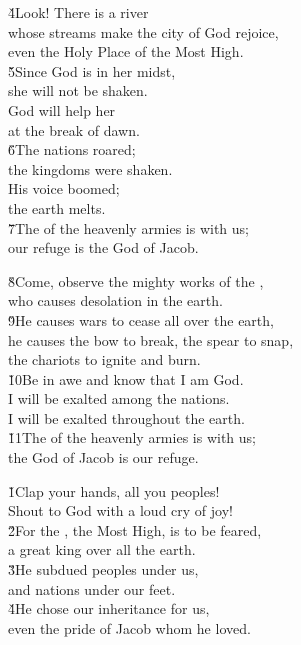 \begin{poetry}
\poeml \v{4}Look! There is a river \\
\poemll    whose streams make the city of God rejoice, \\
\poemlll       even the Holy Place of the Most High. \\
\poeml \v{5}Since God is in her midst, \\
\poemll    she will not be shaken. \\
\poeml God will help her \\
\poemll    at the break of dawn. \\
\poeml \v{6}The nations roared; \\
\poemll    the kingdoms were shaken. \\
\poeml His voice boomed; \\
\poemll    the earth melts. \\
\poeml \v{7}The  of the heavenly armies is with us; \\
\poemll    our refuge is the God of Jacob.
\end{poetry}

\begin{poetry}
\poeml \v{8}Come, observe the mighty works of the , \\
\poemll    who causes desolation in the earth. \\
\poeml \v{9}He causes wars to cease all over the earth, \\
\poemll    he causes the bow to break, the spear to snap, \\
\poemlll       the chariots to ignite and burn. \\
\poeml \v{10}Be in awe and know that I am God. \\
\poemll    I will be exalted among the nations. \\
\poemlll       I will be exalted throughout the earth. \\
\poeml \v{11}The  of the heavenly armies is with us; \\
\poemll    the God of Jacob is our refuge.
\end{poetry}

\begin{poetry}
\poeml \v{1}Clap your hands, all you peoples! \\
\poemll    Shout to God with a loud cry of joy! \\
\poeml \v{2}For the , the Most High, is to be feared, \\
\poemll    a great king over all the earth. \\
\poeml \v{3}He subdued peoples under us, \\
\poemll    and nations under our feet. \\
\poeml \v{4}He chose our inheritance for us, \\
\poemll    even the pride of Jacob whom he loved.
\end{poetry}

